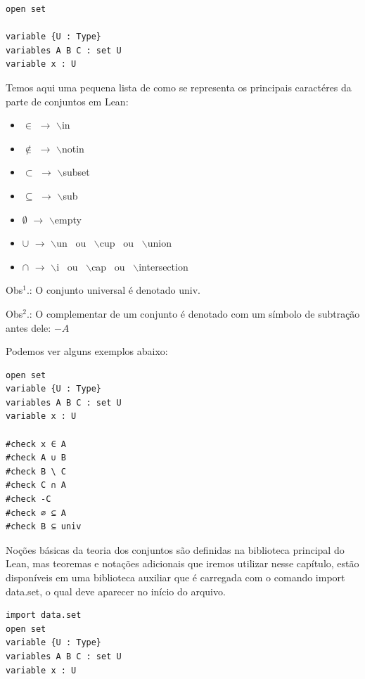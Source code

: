 \begin{lstlisting}
open set

variable {U : Type}
variables A B C : set U
variable x : U \end{lstlisting}

Temos aqui uma pequena lista de como se representa os principais caractéres da parte de conjuntos em Lean:

\begin{itemize}
  \item $\in$ $\rightarrow$ $\backslash$in

  \item $\notin$ $\rightarrow$ $\backslash$notin

  \item $\subset$ $\rightarrow$ $\backslash$subset

  \item $\subseteq$ $\rightarrow$ $\backslash$sub

  \item $\emptyset$ $\rightarrow$ $\backslash$empty

  \item $\cup$ $\rightarrow$ $\backslash$un \ ou \ $\backslash$cup \ ou \ $\backslash$union

  \item $\cap$ $\rightarrow$ $\backslash$i \ ou \ $\backslash$cap \ ou \ $\backslash$intersection
\end{itemize}

Obs$^{1}$.: O conjunto universal é denotado { \selectfont univ}.

Obs$^{2}$.: O complementar de um conjunto é denotado com um símbolo de subtração antes dele: $-A$

Podemos ver alguns exemplos abaixo:
\begin{lstlisting}
open set
variable {U : Type}
variables A B C : set U
variable x : U

#check x ∈ A
#check A ∪ B
#check B \ C
#check C ∩ A
#check -C
#check ∅ ⊆ A
#check B ⊆ univ \end{lstlisting}

Noções básicas da teoria dos conjuntos são definidas na biblioteca principal do Lean, mas teoremas e notações adicionais que iremos utilizar nesse capítulo, estão disponíveis em uma biblioteca auxiliar que é carregada com o comando
{ \selectfont import data.set}, o qual deve aparecer no início do arquivo.

\begin{lstlisting}
import data.set
open set
variable {U : Type}
variables A B C : set U
variable x : U \end{lstlisting}

